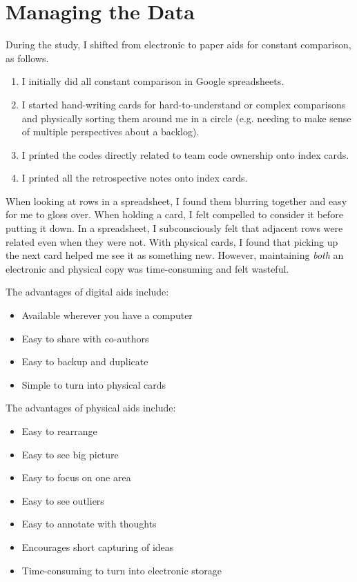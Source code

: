 \section{Managing the Data}
\label{ManagingTheData}
During the study, I shifted from electronic to paper aids for constant comparison, as follows. 
\begin{enumerate}
  \item I initially did all constant comparison in Google spreadsheets.
  \item I started hand-writing cards for hard-to-understand or complex comparisons and physically sorting them around me in a circle (e.g. needing to make sense of multiple perspectives about a backlog).
  \item I printed the codes directly related to team code ownership onto index cards.
  \item I printed all the retrospective notes onto index cards.
\end{enumerate}

When looking at rows in a spreadsheet, I found them blurring together and easy for me to gloss over. When holding a card, I felt compelled to consider it before putting it down. In a spreadsheet, I subconsciously felt that adjacent rows were related even when they were not. With physical cards, I found that picking up the next card helped me see it as something new. However, maintaining \textit{both} an electronic and physical copy was time-consuming and felt wasteful.

The advantages of digital aids include:
\begin{itemize}
  \item Available wherever you have a computer
  \item Easy to share with co-authors
  \item Easy to backup and duplicate
  \item Simple to turn into physical cards
\end{itemize}

The advantages of physical aids include:
\begin{itemize}
  \item Easy to rearrange
  \item Easy to see big picture 
  \item Easy to focus on one area
  \item Easy to see outliers
  \item Easy to annotate with thoughts
  \item Encourages short capturing of ideas
  \item Time-consuming to turn into electronic storage
\end{itemize}

